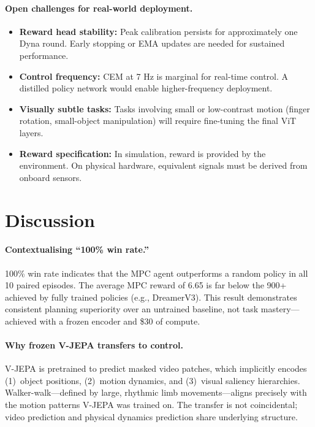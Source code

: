 \documentclass{article}
\begin{document}
\paragraph{Open challenges for real-world deployment.}
\begin{itemize}
    \item \textbf{Reward head stability:} Peak calibration persists for approximately one Dyna round. Early stopping or EMA updates are needed for sustained performance.
    \item \textbf{Control frequency:} CEM at 7 Hz is marginal for real-time control. A distilled policy network would enable higher-frequency deployment.
    \item \textbf{Visually subtle tasks:} Tasks involving small or low-contrast motion (finger rotation, small-object manipulation) will require fine-tuning the final ViT layers.
    \item \textbf{Reward specification:} In simulation, reward is provided by the environment. On physical hardware, equivalent signals must be derived from onboard sensors.
\end{itemize}

\section{Discussion}

\paragraph{Contextualising ``100\% win rate.''}
100\% win rate indicates that the MPC agent outperforms a random policy in all 10 paired episodes. The average MPC reward of 6.65 is far below the 900+ achieved by fully trained policies (e.g., DreamerV3). This result demonstrates consistent planning superiority over an untrained baseline, not task mastery---achieved with a frozen encoder and \$30 of compute.

\paragraph{Why frozen V-JEPA transfers to control.}
V-JEPA is pretrained to predict masked video patches, which implicitly encodes (1)~object positions, (2)~motion dynamics, and (3)~visual saliency hierarchies. Walker-walk---defined by large, rhythmic limb movements---aligns precisely with the motion patterns V-JEPA was trained on. The transfer is not coincidental; video prediction and physical dynamics prediction share underlying structure.
\end{document}
